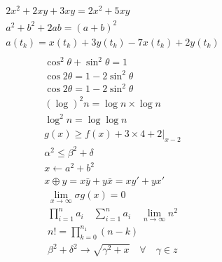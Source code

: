 \documentclass[12pt]{article}
\begin{document}
\begin{align}
2x^2+2xy+3xy=2x^2+5xy \\
a^2+b^2+2ab={(a+b)}^2 \\
a(t_k)=x(t_k)+3y(t_k)-7x(t_k)+2y(t_k)\\
\end{align}
\newpage
\begin{align}
\cos^2\theta+\sin^2\theta=1 \\
\cos2\theta=1-2\sin^2\theta \\
\cos2\theta=1-2\sin^2\theta \\
{(\log)}^{2}n = \log n \times \log n \\
{\log}^{2}n = \log\log n \\
g(x)\geq f(x)+3 \times 4 + 2|_{x-2} \\
\alpha^{2} \leq \beta^{2} + \delta \\
x \gets a^2 + b^2 \\
x \oplus y = x\bar{y}+ y\bar{x}=xy'+yx'
\end{align}
\newpage
\centering
\begin{align}
\lim\limits_{x \to \infty} \sigma g(x) = 0 \\
\prod_{i = 1}^{n} a_{i} \quad \sum_{i=1}^{n} a_{i} \quad \lim_{n \to \infty} n^{2} \\
n! = \prod_{k=0}^{n_1}(n-k) \\
\beta^2+\delta^2\rightarrow \sqrt{\gamma^2+x} \quad \forall \quad\gamma\in z
\end{align}
\end{document}
